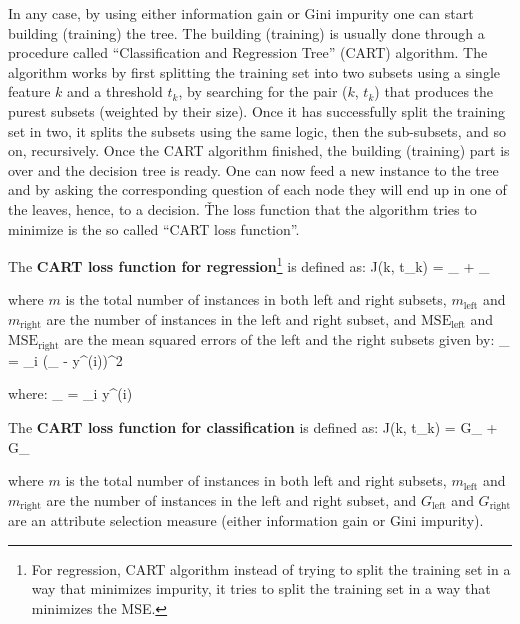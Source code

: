 In any case, by using either information gain or Gini impurity one can start building (training) the tree. The
building (training) is usually done through a procedure called ``Classification and Regression Tree'' (CART)
algorithm. The algorithm works by first splitting the training set into two subsets using a single feature $k$ and a
threshold $t_k$, by searching for the pair ($k$, $t_k$) that produces the purest subsets (weighted by their size).
Once it has successfully split the training set in two, it splits the subsets using the same logic, then the
sub-subsets, and so on, recursively. Once the CART algorithm finished, the building (training) part is over and the
decision tree is ready. One can now feed a new instance to the tree and by asking the corresponding question of each
node they will end up in one of the leaves, hence, to a decision. \v

The loss function that the algorithm tries to minimize is the so called ``CART loss function''.

The \textbf{CART loss function for regression}\footnote{For regression, CART algorithm instead of trying to split the
training set in a way that minimizes impurity, it tries to split the training set in a way that minimizes the MSE\@.}
is defined as:
\bse
J(k, t_{k}) =  _{} + _{}
\ese

where $m$ is the total number of instances in both left and right subsets, $m_{\text{left}}$ and $m_{\text{right}}$ are
the number of instances in the left and right subset, and $\text{MSE}_{\text{left}}$ and $\text{MSE}_{\text{right}}$ are
the mean squared errors of the left and the right subsets given by:
\bse
{}_{} = \sum_{i \in {}} ({}_ - y^{(i)})^2
\ese

where:
\bse
{}_ =  \sum_{i \in {}} y^{(i)}
\ese

The \textbf{CART loss function for classification} is defined as:
\bse
J(k, t_{k}) =  G_{} +  G_{}
\ese

where $m$ is the total number of instances in both left and right subsets, $m_{\text{left}}$ and $m_{\text{right}}$ are
the number of instances in the left and right subset, and $G_{\text{left}}$ and $G_{\text{right}}$ are an attribute
selection measure (either information gain or Gini impurity).
\ed

